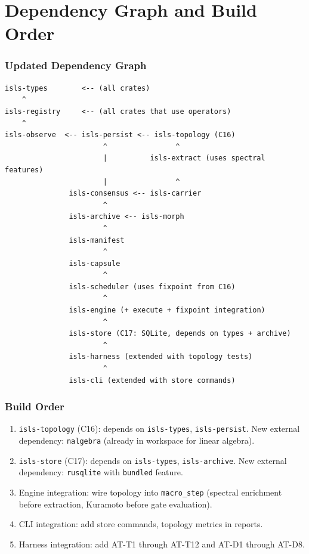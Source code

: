 \documentclass[11pt,a4paper,twoside]{article}
\theoremstyle{definition}
\theoremstyle{plain}
\theoremstyle{remark}
\begin{document}
\part{Dependency Graph and Build Order}

\section{Updated Dependency Graph}

\begin{verbatim}
isls-types        <-- (all crates)
    ^
isls-registry     <-- (all crates that use operators)
    ^
isls-observe  <-- isls-persist <-- isls-topology (C16)
                       ^                ^
                       |          isls-extract (uses spectral features)
                       |                ^
               isls-consensus <-- isls-carrier
                       ^
               isls-archive <-- isls-morph
                       ^
               isls-manifest
                       ^
               isls-capsule
                       ^
               isls-scheduler (uses fixpoint from C16)
                       ^
               isls-engine (+ execute + fixpoint integration)
                       ^
               isls-store (C17: SQLite, depends on types + archive)
                       ^
               isls-harness (extended with topology tests)
                       ^
               isls-cli (extended with store commands)
\end{verbatim}

\section{Build Order}

\begin{enumerate}[nosep]
  \item \texttt{isls-topology} (C16): depends on \texttt{isls-types},
        \texttt{isls-persist}. New external dependency: \texttt{nalgebra}
        (already in workspace for linear algebra).
  \item \texttt{isls-store} (C17): depends on \texttt{isls-types},
        \texttt{isls-archive}. New external dependency:
        \texttt{rusqlite} with \texttt{bundled} feature.
  \item Engine integration: wire topology into \texttt{macro\_step}
        (spectral enrichment before extraction, Kuramoto before gate
        evaluation).
  \item CLI integration: add store commands, topology metrics in
        reports.
  \item Harness integration: add AT-T1 through AT-T12 and AT-D1
        through AT-D8.
\end{enumerate}
\end{document}

